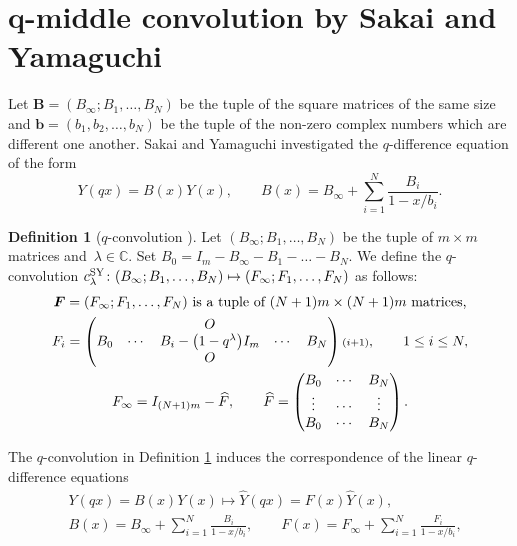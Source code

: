 \documentclass[pdftex]{sigma}
\numberwithin{equation}{section}
\theoremstyle{definition}
\newtheorem{Definition}[Theorem]{Definition}
\begin{document}
\appendix

\section[q-middle convolution by Sakai and Yamaguchi]{$\boldsymbol{q}$-middle convolution by Sakai and Yamaguchi} \label{sec:qmcSY}

Let $\boldsymbol{B}= ( B_{\infty};B_{1} ,\dots ,B_N ) $ be the tuple of the square matrices of the same size and $\mathbf{b}= (b_1, b_2, \dots ,b_N)$ be the tuple of the non-zero complex numbers which are different one another.
Sakai and Yamaguchi investigated the $q$-difference equation of the form
\begin{equation}
Y(q x) = B(x)Y(x), \qquad B(x) = B_{\infty} + \sum^{N}_{i = 1}\frac{B_{i}}{1 - x/b_{i}}.
\label{eq:YqxBYx1}
\end{equation}
\begin{Definition}[$q$-convolution \cite{SY}] \label{def:qc}
Let $ ( B_{\infty}; B_{1} ,\dots ,B_N ) $ be the tuple of $m\times m $ matrices and~${\lambda \in \mathbb{C}} $.
Set $B_0 = I_m - B_\infty - B_{1} - \dots -B_N$.
We define the $q$-convolution $c_\lambda^{\rm SY}\colon ( B_{\infty};B_{1} ,\dots ,\allowbreak B_N ) \mapsto ( F_{\infty};F_{1} ,\dots ,F_N )$ as follows:
\begin{gather}
 \boldsymbol{F} = ( F_\infty ; F_1, \dots , F_N) \mbox{ \rm is a tuple of $(N+1)m \times (N+1)m$ matrices,}\nonumber \\
 F_i = \left(
 \begin{matrix}
 {} & {} & O & {} & {} \\
 B_0 & \cdots & B_i - \bigl(1-q^\lambda\bigr)I_m & \cdots & B_N \\
 {} & {} & O & {} & {}
 \end{matrix}
 \right)
 {\scriptstyle (i+1)} , \qquad 1\leq i \leq N, \nonumber \\
 F_\infty = I_{(N+1)m} - \widehat{F}, \qquad
 \widehat{F}
 = \left(
 \begin{matrix}
 B_0 & \cdots & B_N \\
 \vdots & \cdots & \vdots \\
 B_0 & \cdots & B_N
 \end{matrix}
 \right).  \label{eq:bF}
\end{gather}
\end{Definition}
The $q$-convolution in Definition \ref{def:qc} induces the correspondence of the linear $q$-difference equations
\begin{align*}
& Y(q x) = B(x)Y(x) \mapsto \widehat{Y}(q x) = F(x)\widehat{Y}(x) , \\
&B(x) = B_{\infty} + \sum^{N}_{i = 1}\frac{B_{i}}{1 - x/b_{i}} ,\qquad F(x) = F_{\infty} + \sum^{N}_{i = 1}\frac{F_{i}}{1 - x/b_{i}} ,
\end{align*}
\end{document}
